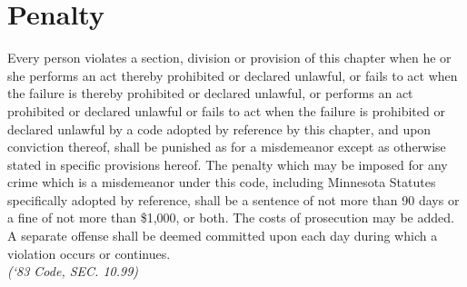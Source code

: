 \setcounter{section}{98}
\section{Penalty}
Every person violates a section, division or provision of this chapter when he or she performs an act thereby prohibited or declared unlawful, or fails to act when the failure is thereby prohibited or declared unlawful, or performs an act prohibited or declared unlawful or fails to act when the failure is prohibited or declared unlawful by a code adopted by reference by this chapter, and upon conviction thereof, shall be punished as for a misdemeanor except as otherwise stated in specific provisions hereof. The penalty which may be imposed for any crime which is a misdemeanor under this code, including Minnesota Statutes specifically adopted by reference, shall be a sentence of not more than 90 days or a fine of not more than \$1,000, or both. The costs of prosecution may be added. A separate offense shall be deemed committed upon each day during which a violation occurs or continues.\\
\emph{(‘83 Code, SEC. 10.99)}
